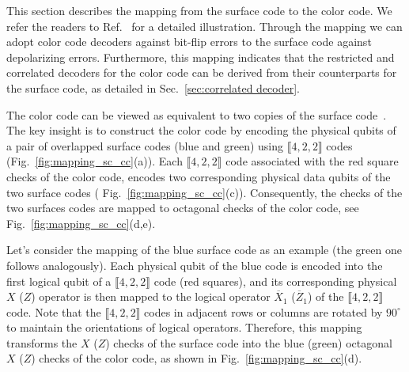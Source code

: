 \documentclass[%
 reprint,
 amsmath,amssymb,
 aps,
]{revtex4-2}
\begin{document}
This section describes the mapping from the surface code to the color code. We refer the readers to Ref.~\cite{benhemou2025minimising} for a detailed illustration. Through the mapping we can adopt color code decoders against bit-flip errors to the surface code against depolarizing errors. Furthermore, this mapping indicates that the restricted and correlated decoders for the color code can be derived from their counterparts for the surface code, as detailed in Sec.~\ref{sec:correlated decoder}.

The color code can be viewed as equivalent to two copies of the surface code~\cite{yoshida2011classification, bombin2012universal, Bhagoji15, Kubica_2015, criger2016noise, benhemou2025minimising}. The key insight is to construct the color code by encoding the physical qubits of a pair of overlapped surface codes (blue and green) using $\llbracket 4,2,2 \rrbracket$ codes (Fig.~\ref{fig:mapping_sc_cc}(a)). Each $\llbracket 4,2,2 \rrbracket$ code associated with the red square checks of the color code, encodes two corresponding physical data qubits of the two surface codes ( Fig.~\ref{fig:mapping_sc_cc}(c)). Consequently, the checks of the two surfaces codes are mapped to octagonal checks of the color code, see Fig.~\ref{fig:mapping_sc_cc}(d,e). 

Let's consider the mapping of the blue surface code as an example (the green one follows analogously). Each physical qubit of the blue code is encoded into the first logical qubit of a $\llbracket 4,2,2 \rrbracket$ code (red squares), and its corresponding physical $X$ ($Z$) operator is then mapped to the logical operator $\overline{X}_1$ ($\overline{Z}_1$) of the $\llbracket 4,2,2 \rrbracket$ code. Note that the $\llbracket 4,2,2 \rrbracket$ codes in adjacent rows or columns are rotated by $90^\circ$ to maintain the orientations of logical operators. Therefore, this mapping transforms the $X$ ($Z$) checks of the surface code into the blue (green) octagonal $X$ ($Z$) checks of the color code, as shown in Fig.~\ref{fig:mapping_sc_cc}(d). 
\end{document}
